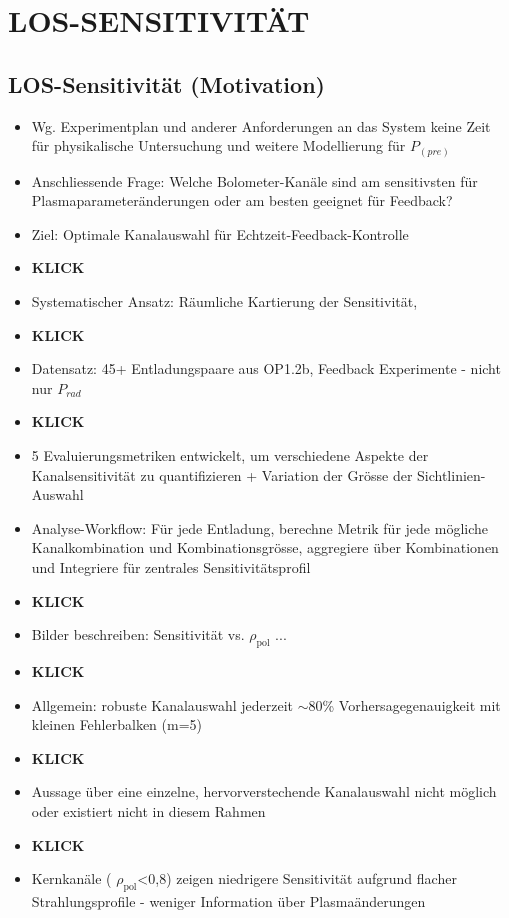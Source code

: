 \documentclass[11pt,a4paper]{article}
\begin{document}
\section{LOS-SENSITIVITÄT}

\subsection{LOS-Sensitivität (Motivation)}

\begin{itemize}
\item Wg. Experimentplan und anderer Anforderungen an das System keine Zeit für physikalische Untersuchung und weitere Modellierung für $P_{(pre)}$
\item Anschliessende Frage: Welche Bolometer-Kanäle sind am sensitivsten für Plasmaparameteränderungen oder am besten geeignet für Feedback?
\item Ziel: Optimale Kanalauswahl für Echtzeit-Feedback-Kontrolle
\item \textbf{KLICK}
\item Systematischer Ansatz: Räumliche Kartierung der Sensitivität,
\item \textbf{KLICK}
\item Datensatz: 45+ Entladungspaare aus OP1.2b, Feedback Experimente - nicht nur $P_{rad}$
\item \textbf{KLICK}
\item 5 Evaluierungsmetriken entwickelt, um verschiedene Aspekte der Kanalsensitivität zu quantifizieren + Variation der Grösse der Sichtlinien-Auswahl
\item Analyse-Workflow: Für jede Entladung, berechne Metrik für jede mögliche Kanalkombination und Kombinationsgrösse, aggregiere über Kombinationen und Integriere für zentrales Sensitivitätsprofil
\item \textbf{KLICK}
\item Bilder beschreiben: Sensitivität vs. $\rho_{\text{pol}}$ ...
\item \textbf{KLICK}
\item Allgemein: robuste Kanalauswahl jederzeit $\sim$80\% Vorhersagegenauigkeit mit kleinen Fehlerbalken (m=5)
\item \textbf{KLICK}
\item Aussage über eine einzelne, hervorverstechende Kanalauswahl nicht möglich oder existiert nicht in diesem Rahmen
\item \textbf{KLICK}
\item Kernkanäle ( $\rho_{\text{pol}}$<0,8) zeigen niedrigere Sensitivität aufgrund flacher Strahlungsprofile - weniger Information über Plasmaänderungen

\end{itemize}
\end{document}
